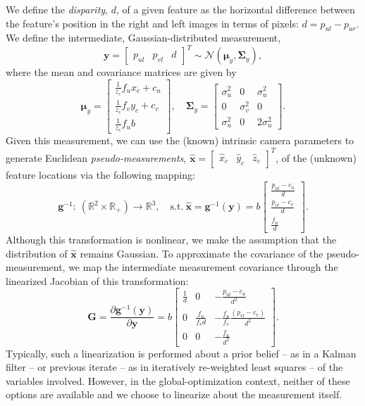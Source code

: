 \documentclass[lettersize,journal]{IEEEtran}
\begin{document}
We define the \textit{disparity}, $ d $, of a given feature as the horizontal difference between the feature's position in the right and left images in terms of pixels: $ d = p_{ul} - p_{ur} $. We define the intermediate, Gaussian-distributed measurement, 
\begin{equation}
	\bm{y} = \begin{bmatrix}p_{ul}&p_{vl}&d\end{bmatrix}^T \sim \mathcal{N}(\bm{\mu}_y, \bm{\Sigma}_y),
\end{equation}
where the mean and covariance matrices are given by
\begin{equation}
	\bm{\mu}_y = \begin{bmatrix}
		\frac{1}{z_c}f_u x_c + c_u \\ \frac{1}{z_c}f_v y_c + c_v \\ \frac{1}{z_c}f_u b
	\end{bmatrix},\quad \bm{\Sigma}_y = \begin{bmatrix}
		\sigma_u^2 & 0 & \sigma_u^2\\
		0 & \sigma_v^2 & 0 \\
		\sigma_u^2 & 0 & 2\sigma_u^2
	\end{bmatrix}.
\end{equation}
Given this measurement, we can use the (known) intrinsic camera parameters to generate Euclidean \textit{pseudo-measurements}, $ \hat{\bm{x}} = \begin{bmatrix}\hat{x}_c &\hat{y}_c & \hat{z}_c \end{bmatrix}^T $, of the (unknown) feature locations via the following mapping:
\begin{equation}
	\bm{g}^{-1}:~(\mathbb{R}^2\times\mathbb{R}_+) \rightarrow \mathbb{R}^3, \quad \mbox{s.t.}~\hat{\bm{x}} = \bm{g}^{-1}(\bm{y})=b\begin{bmatrix}
	 	\frac{p_{ul}-c_u}{d} \\ \frac{p_{vl}-c_v}{d} \\ \frac{f_u}{d} 
	 \end{bmatrix}.
\end{equation}
Although this transformation is nonlinear, we make the assumption that the distribution of $ \hat{\bm{x}} $ remains Gaussian. To approximate the covariance of the pseudo-measurement, we map the intermediate measurement covariance through the linearized Jacobian of this transformation:
\begin{equation}
	\bm{G} = \frac{\partial \bm{g}^{-1}(\bm{y})}{\partial \bm{y}} = b\begin{bmatrix}
		\frac{1}{d} & 0 & -\frac{p_{ul} - c_u}{d^2} \\
		0 & \frac{f_u}{f_v d} & -\frac{f_u}{f_v }\frac{(p_{vl} - c_v)}{d^2} \\
		0 & 0 & -\frac{f_u}{d^2}
	\end{bmatrix}.
\end{equation}
Typically, such a linearization is performed about a prior belief -- as in a Kalman filter -- or previous iterate -- as in iteratively re-weighted least squares --  of the variables involved. However, in the global-optimization context, neither of these options are available and we choose to linearize about the measurement itself. 
\end{document}
